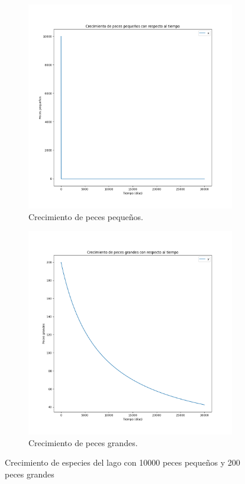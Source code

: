\documentclass[11pt,a4paper]{report}
\begin{document}
\begin{figure}[H]
  \begin{subfigure}[b]{0.49\textwidth}
    \includegraphics[width=\textwidth, height=\textwidth]{img/Cap-3/apartado-1/peces_pequenos_200.png}
    \caption{Crecimiento de peces pequeños.}
    \label{fig:f1}
  \end{subfigure}
  \hfill
  \begin{subfigure}[b]{0.49\textwidth}
    \includegraphics[width=\textwidth, height=\textwidth]{img/Cap-3/apartado-1/peces_grandes_200.png}
    \caption{Crecimiento de peces grandes.}
    \label{fig:f2}
  \end{subfigure}
  \caption{Crecimiento de especies del lago con 10000 peces pequeños y 200 peces grandes}
\end{figure}
\end{document}
